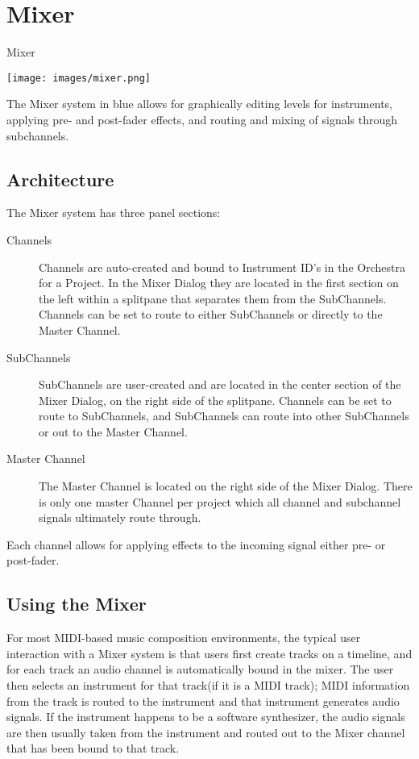 \section{Mixer}\label{mixer}

Mixer

\texttt{[image: images/mixer.png]}

The Mixer system in blue allows for graphically editing levels for
instruments, applying pre- and post-fader effects, and routing and
mixing of signals through subchannels.

\subsection{Architecture}

The Mixer system has three panel sections:

\begin{description}
\item[Channels]
Channels are auto-created and bound to Instrument ID's in the Orchestra
for a Project. In the Mixer Dialog they are located in the first section
on the left within a splitpane that separates them from the SubChannels.
Channels can be set to route to either SubChannels or directly to the
Master Channel.
\item[SubChannels]
SubChannels are user-created and are located in the center section of
the Mixer Dialog, on the right side of the splitpane. Channels can be
set to route to SubChannels, and SubChannels can route into other
SubChannels or out to the Master Channel.
\item[Master Channel]
The Master Channel is located on the right side of the Mixer Dialog.
There is only one master Channel per project which all channel and
subchannel signals ultimately route through.
\end{description}

Each channel allows for applying effects to the incoming signal either
pre- or post-fader.

\subsection{Using the Mixer}

For most MIDI-based music composition environments, the typical user
interaction with a Mixer system is that users first create tracks on a
timeline, and for each track an audio channel is automatically bound in
the mixer. The user then selects an instrument for that track(if it is a
MIDI track); MIDI information from the track is routed to the instrument
and that instrument generates audio signals. If the instrument happens
to be a software synthesizer, the audio signals are then usually taken
from the instrument and routed out to the Mixer channel that has been
bound to that track.

